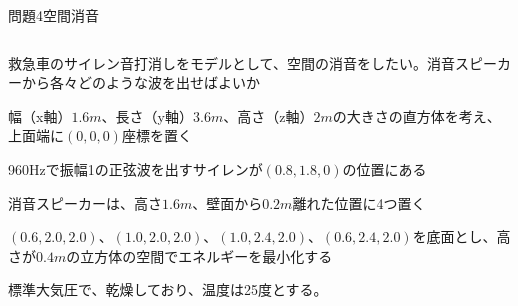 \documentclass[dvipdfmx]{beamer}
\newenvironment{wideitemize}{\itemize\setlength{\itemsep}{1em}}{\enditemize}
\newenvironment{wideitemize2}{\itemize\setlength{\itemsep}{0.2em}}{\enditemize}
\begin{document}

\begin{frame}{問題4}{空間消音}
\begin{columns}[t]
\begin{column}{0.7\textwidth}
\begin{wideitemize}
	\item 救急車のサイレン音打消しをモデルとして、空間の消音をしたい。消音スピーカーから各々どのような波を出せばよいか
	\begin{wideitemize2}
		\item 幅（x軸）$1.6m$、長さ（y軸）$3.6m$、高さ（z軸）$2m$の大きさの直方体を考え、上面端に$(0, 0, 0)$座標を置く
		\item 960Hzで振幅1の正弦波を出すサイレンが$(0.8,1.8,0)$の位置にある
		\item 消音スピーカーは、高さ$1.6m$、壁面から$0.2m$離れた位置に4つ置く
		\item $(0.6, 2.0, 2.0)$、$(1.0, 2.0, 2.0)$、$(1.0, 2.4, 2.0)$、$(0.6, 2.4, 2.0)$を底面とし、高さが$0.4m$の立方体の空間でエネルギーを最小化する
		\item 標準大気圧で、乾燥しており、温度は25度とする。
	\end{wideitemize2}

\end{wideitemize}


\end{column}
\end{columns}
\end{frame}
\end{document}

